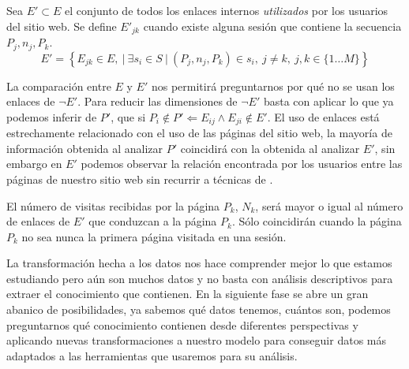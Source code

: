 \begin{Definition}\label{def:1-2-4-cjto-enlacesInternosUsados}
   Sea $E' \subset E$ el conjunto de todos los enlaces internos \emph{utilizados} por los usuarios del sitio web. Se define $E'_{jk}$ cuando existe alguna sesión que contiene la secuencia $P_j, n_j, P_k$.
  \begin{equation}\label{eq:1-2-4-cjto-enlacesUsados}
    E' = \left\{E_{jk} \in E,\ | \ \exists s_i \in S \ | \ (P_j, n_j, P_k) \in s_i,\ j\neq k,\ j,k\in\{1\ldots M\}\right\}
  \end{equation}
\end{Definition}

La comparación entre $E$ y $E'$ nos permitirá preguntarnos por qué no se usan los enlaces de $\neg E'$. Para reducir las dimensiones de $\neg E'$ basta con aplicar lo que ya podemos inferir de $P'$, que si $P_i \notin P' \Leftarrow E_{ij} \wedge E_{ji} \notin E'$. El uso de enlaces está estrechamente relacionado con el uso de las páginas del sitio web, la mayoría de información obtenida al analizar $P'$ coincidirá con la obtenida al analizar $E'$, sin embargo en $E'$ podemos observar la relación encontrada por los usuarios entre las páginas de nuestro sitio web sin recurrir a técnicas de \DM.

El número de visitas recibidas por la página $P_k$, $N_k$, será mayor o igual al número de enlaces de $E'$ que conduzcan a la página $P_k$. Sólo coincidirán cuando la página $P_k$ no sea nunca la primera página visitada en una sesión.

La transformación hecha a los datos nos hace comprender mejor lo que estamos estudiando pero aún son muchos datos y no basta con análisis descriptivos para extraer el conocimiento que contienen. En la siguiente fase se abre un gran abanico de posibilidades, ya sabemos qué datos tenemos, cuántos son, podemos preguntarnos qué conocimiento contienen desde diferentes perspectivas y aplicando nuevas transformaciones a nuestro modelo para conseguir datos más adaptados a las herramientas que usaremos para su análisis.
